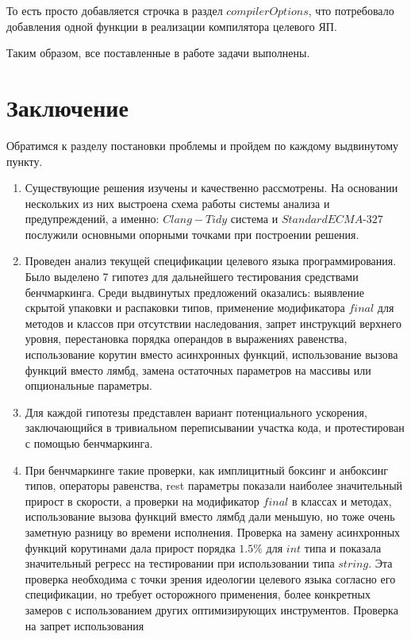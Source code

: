 \documentclass{mipt-thesis-bs}
\begin{document}
То есть просто добавляется строчка в раздел $compilerOptions$, что потребовало добавления 
одной функции в реализации компилятора целевого ЯП.

Таким образом, все поставленные в работе задачи выполнены.

\chapter{Заключение}

Обратимся к разделу постановки проблемы и пройдем по каждому выдвинутому пункту.

\begin{enumerate}
    \item Существующие решения изучены и качественно рассмотрены. На основании нескольких из них выстроена схема 
    работы системы анализа и предупреждений, а именно: $Clang-Tidy$ система и $Standard ECMA$-$327$ послужили основными опорными 
    точками при построении решения.
    \item Проведен анализ текущей спецификации целевого языка программирования. Было выделено 7 гипотез для дальнейшего тестирования 
    средствами бенчмаркинга. Среди выдвинутых предложений оказались: выявление скрытой упаковки 
    и распаковки типов, применение модификатора $final$ для методов и классов при отсутствии наследования, 
    запрет инструкций верхнего уровня, перестановка порядка операндов в выражениях равенства, 
    использование корутин вместо асинхронных функций, использование вызова функций вместо лямбд,
    замена остаточных параметров на массивы или опциональные параметры.
    \item Для каждой гипотезы представлен вариант потенциального ускорения, заключающийся в тривиальном 
    переписывании участка кода, и протестирован с помощью бенчмаркинга.
    \item При бенчмаркинге такие проверки, как имплицитный боксинг и анбоксинг типов, операторы равенства, rest 
    параметры показали наиболее значительный прирост в скорости, а проверки на модификатор $final$ в классах 
    и методах, использование вызова функций вместо лямбд дали меньшую, но тоже очень заметную разницу
    во времени исполнения. Проверка на замену асинхронных функций корутинами дала прирост порядка $1.5\%$ для 
    $int$ типа и показала значительный регресс на тестировании при использовании типа $string$. Эта проверка 
    необходима с точки зрения идеологии целевого языка согласно его спецификации, но требует осторожного применения, 
    более конкретных замеров с использованием других оптимизирующих инструментов. Проверка на запрет использования 

\end{enumerate}
\end{document}
